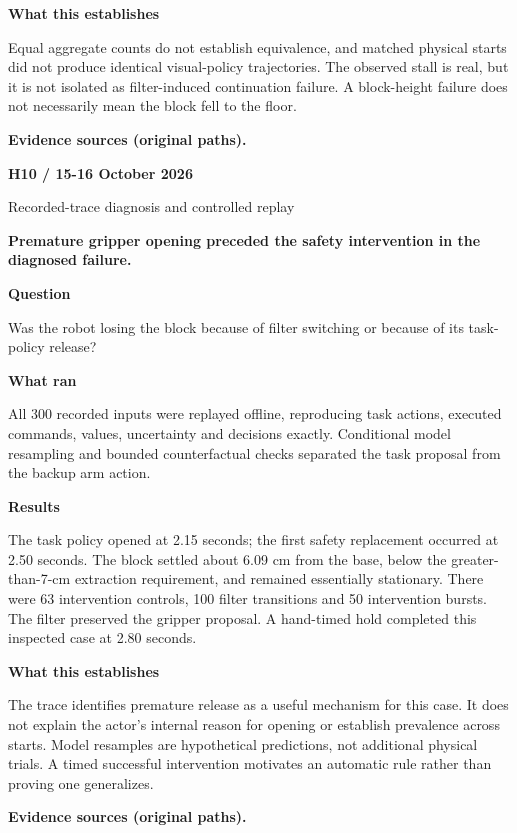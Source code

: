 \documentclass[11pt,a4paper]{article}
\newcommand{\block}[2]{\par\textbf{\color{ink}#1}\par\nopagebreak #2\par}
\newcommand{\finding}[1]{\begin{tcolorbox}[colback=pale,colframe=pale,boxrule=0pt,arc=1mm,left=10pt,right=10pt,top=10pt,bottom=10pt]\color{ink}\large\bfseries #1\end{tcolorbox}}
\begin{document}
\block{What this establishes}{Equal aggregate counts do not establish equivalence, and matched physical starts did not produce identical visual-policy trajectories. The observed stall is real, but it is not isolated as filter-induced continuation failure. A block-height failure does not necessarily mean the block fell to the floor.}
\vfill{\footnotesize\color{muted}\textbf{Evidence sources (original paths).}\par
\raggedright {}}
\clearpage
{}\label{exp:H10}
{\color{accent}\small\bfseries H10 / 15-16 October 2026}\par
{}\par
{\color{muted}\small Recorded-trace diagnosis and controlled replay}\par\vspace{2mm}
\finding{Premature gripper opening preceded the safety intervention in the diagnosed failure.}
\block{Question}{Was the robot losing the block because of filter switching or because of its task-policy release?}
\block{What ran}{All 300 recorded inputs were replayed offline, reproducing task actions, executed commands, values, uncertainty and decisions exactly. Conditional model resampling and bounded counterfactual checks separated the task proposal from the backup arm action.}
\block{Results}{The task policy opened at 2.15 seconds; the first safety replacement occurred at 2.50 seconds. The block settled about 6.09 cm from the base, below the greater-than-7-cm extraction requirement, and remained essentially stationary. There were 63 intervention controls, 100 filter transitions and 50 intervention bursts. The filter preserved the gripper proposal. A hand-timed hold completed this inspected case at 2.80 seconds.}
\block{What this establishes}{The trace identifies premature release as a useful mechanism for this case. It does not explain the actor's internal reason for opening or establish prevalence across starts. Model resamples are hypothetical predictions, not additional physical trials. A timed successful intervention motivates an automatic rule rather than proving one generalizes.}
\vfill{\footnotesize\color{muted}\textbf{Evidence sources (original paths).}\par
\raggedright {}\par {}}
\end{document}

